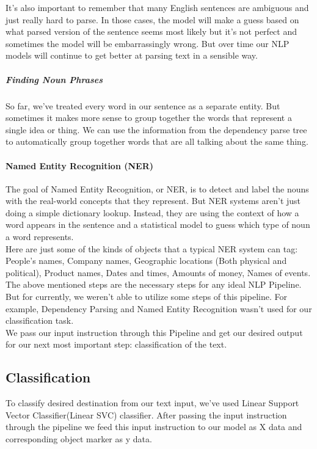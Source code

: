 It’s also important to remember that many English sentences are ambiguous and just really hard to parse. In those cases, the model will make a guess based on what parsed version of the sentence seems most likely but it’s not perfect and sometimes the model will be embarrassingly wrong. But over time our NLP models will continue to get better at parsing text in a sensible way.

\subparagraph{Finding Noun Phrases}
So far, we’ve treated every word in our sentence as a separate entity. But sometimes it makes more sense to group together the words that represent a single idea or thing. We can use the information from the dependency parse tree to automatically group together words that are all talking about the same thing.

\paragraph{Named Entity Recognition (NER)}
The goal of Named Entity Recognition, or NER, is to detect and label the nouns with the real-world concepts that they represent. But NER systems aren’t just doing a simple dictionary lookup. Instead, they are using the context of how a word appears in the sentence and a statistical model to guess which type of noun a word represents.\\

Here are just some of the kinds of objects that a typical NER system can tag: People’s names, Company names, Geographic locations (Both physical and political), Product names, Dates and times, Amounts of money, Names of events.\\

The above mentioned steps are the necessary steps for any ideal NLP Pipeline. But for currently, we weren't able to utilize some steps of this pipeline. For example, Dependency Parsing and Named Entity Recognition wasn't used for our classification task.\\

We pass our input instruction through this Pipeline and get our desired output for our next most important step: classification of the text.\\


\subsection{Classification}
To classify desired destination from our text input, we've used Linear Support Vector Classifier(Linear SVC) classifier. After passing the input instruction through the pipeline we feed this input instruction to our model as X data and corresponding object marker as y data.\\

